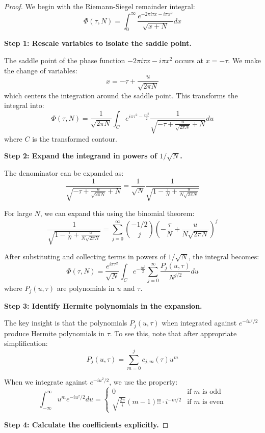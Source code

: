 \documentclass{article}
\begin{document}
\begin{proof}
We begin with the Riemann-Siegel remainder integral:
\[
\Phi(\tau, N) = \int_0^{\infty}\frac{e^{-2\pi i\tau x - i\pi x^2}}{\sqrt{x + N}}dx
\]

\noindent\textbf{Step 1: Rescale variables to isolate the saddle point.}

The saddle point of the phase function $-2\pi i\tau x - i\pi x^2$ occurs at $x = -\tau$. We make the change of variables:
\[
x = -\tau + \frac{u}{\sqrt{2\pi N}}
\]
which centers the integration around the saddle point. This transforms the integral into:
\[
\Phi(\tau, N) = \frac{1}{\sqrt{2\pi N}} \int_{C} e^{i\pi\tau^2 - \frac{i u^2}{2}} \frac{1}{\sqrt{-\tau + \frac{u}{\sqrt{2\pi N}} + N}} du
\]
where $C$ is the transformed contour.

\noindent\textbf{Step 2: Expand the integrand in powers of $1/\sqrt{N}$.}

The denominator can be expanded as:
\[
\frac{1}{\sqrt{-\tau + \frac{u}{\sqrt{2\pi N}} + N}} = \frac{1}{\sqrt{N}}\frac{1}{\sqrt{1 - \frac{\tau}{N} + \frac{u}{N\sqrt{2\pi N}}}}
\]

For large $N$, we can expand this using the binomial theorem:
\[
\frac{1}{\sqrt{1 - \frac{\tau}{N} + \frac{u}{N\sqrt{2\pi N}}}} = \sum_{j=0}^{\infty} \binom{-1/2}{j}\left(-\frac{\tau}{N} + \frac{u}{N\sqrt{2\pi N}}\right)^j
\]

After substituting and collecting terms in powers of $1/\sqrt{N}$, the integral becomes:
\[
\Phi(\tau, N) = \frac{e^{i\pi\tau^2}}{\sqrt{N}} \int_{C} e^{- \frac{i u^2}{2}} \sum_{j=0}^{\infty} \frac{P_j(u,\tau)}{N^{j/2}} du
\]
where $P_j(u,\tau)$ are polynomials in $u$ and $\tau$.

\noindent\textbf{Step 3: Identify Hermite polynomials in the expansion.}

The key insight is that the polynomials $P_j(u,\tau)$ when integrated against $e^{-iu^2/2}$ produce Hermite polynomials in $\tau$. To see this, note that after appropriate simplification:
\[
P_j(u,\tau) = \sum_{m=0}^{j} c_{j,m}(\tau) u^m
\]

When we integrate against $e^{-iu^2/2}$, we use the property:
\[
\int_{-\infty}^{\infty} u^m e^{-iu^2/2} du = 
\begin{cases}
0 & \text{if } m \text{ is odd} \\
\sqrt{\frac{2\pi}{i}}(m-1)!! \cdot i^{-m/2} & \text{if } m \text{ is even}
\end{cases}
\]

\noindent\textbf{Step 4: Calculate the coefficients explicitly.}


\end{proof}
\end{document}
